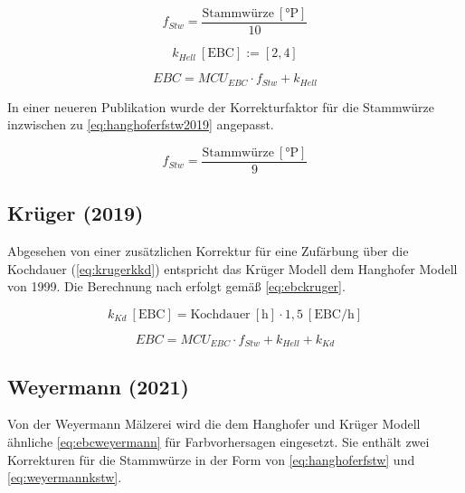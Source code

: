 \documentclass[a4paper,parskip=half]{scrartcl}
\newcommand{\MCUEBC}{\mathit{MCU}_{EBC}}
\newcommand{\EBC}{\mathit{EBC}}
\newcommand{\uebc}{\:[\textrm{EBC}]}
\newcommand{\uebch}{\:[\textrm{EBC/h}]}
\newcommand{\uplato}{\:[\textrm{°P}]}
\newcommand{\fstw}{f_{Stw}}
\newcommand{\khell}{k_{Hell}}
\newcommand{\kkd}{k_{Kd}}
\newcommand{\uhour}{\:[\textrm{h}]}
\begin{document}
\begin{equation}
\fstw = \frac{\text{Stammwürze} \uplato}{10}
\label{eq:hanghoferfstw}
\end{equation}

\begin{equation}
\khell \uebc := \left[2, 4 \right]
\label{eq:hanghoferhell}
\end{equation}

\begin{equation}
\EBC = \MCUEBC \cdot \fstw + \khell
\label{eq:ebchanghofer}
\end{equation}

In einer neueren Publikation wurde der Korrekturfaktor für die Stammwürze inzwischen zu \autoref{eq:hanghoferfstw2019} angepasst. \parencite[78]{Hanghofer2019}

\begin{equation}
\fstw = \frac{\text{Stammwürze} \uplato}{9}
\label{eq:hanghoferfstw2019}
\end{equation}

\subsection*{Krüger (2019)}

Abgesehen von einer zusätzlichen Korrektur für eine Zufärbung über die Kochdauer (\autoref{eq:krugerkkd}) entspricht das Krüger Modell dem Hanghofer Modell von 1999. Die Berechnung nach \textcite{Krueger2019} erfolgt gemäß \autoref{eq:ebckruger}.

\begin{equation}
\kkd \uebc = \text{Kochdauer} \uhour \cdot 1,5 \uebch
\label{eq:krugerkkd}
\end{equation}

\begin{equation}
\EBC = \MCUEBC \cdot \fstw + \khell + \kkd
\label{eq:ebckruger}
\end{equation}

\subsection*{Weyermann (2021)}

Von der Weyermann Mälzerei wird die dem Hanghofer und Krüger Modell ähnliche \autoref{eq:ebcweyermann} für Farbvorhersagen eingesetzt. Sie enthält zwei Korrekturen für die Stammwürze in der Form von \autoref{eq:hanghoferfstw} und \autoref{eq:weyermannkstw}. \parencite{KrausWeyermann2021b}
\end{document}
